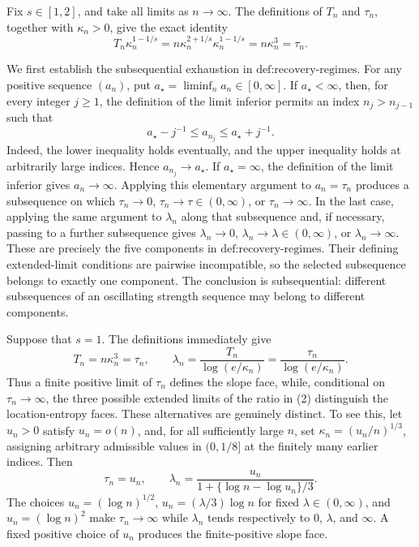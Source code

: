 Fix \(s\in[1,2]\), and take all limits as \(n\to\infty\).  The definitions of \(T_n\) and \(\tau_n\), together with \(\kappa_n>0\), give the exact identity
\[
 T_n\kappa_n^{1-1/s}
 =n\kappa_n^{2+1/s}\kappa_n^{1-1/s}
 =n\kappa_n^3
 =\tau_n.
 \tag{1}
\]

We first establish the subsequential exhaustion in \(\text{def:recovery-regimes}\).  For any positive sequence \((a_n)\), put \(a_\star=\liminf_n a_n\in[0,\infty]\).  If \(a_\star<\infty\), then, for every integer \(j\ge1\), the definition of the limit inferior permits an index \(n_j>n_{j-1}\) such that
\[
 a_\star-j^{-1}\le a_{n_j}\le a_\star+j^{-1}.
\]
Indeed, the lower inequality holds eventually, and the upper inequality holds at arbitrarily large indices.  Hence \(a_{n_j}\to a_\star\).  If \(a_\star=\infty\), the definition of the limit inferior gives \(a_n\to\infty\).  Applying this elementary argument to \(a_n=\tau_n\) produces a subsequence on which \(\tau_n\to0\), \(\tau_n\to\tau\in(0,\infty)\), or \(\tau_n\to\infty\).  In the last case, applying the same argument to \(\lambda_n\) along that subsequence and, if necessary, passing to a further subsequence gives \(\lambda_n\to0\), \(\lambda_n\to\lambda\in(0,\infty)\), or \(\lambda_n\to\infty\).  These are precisely the five components in \(\text{def:recovery-regimes}\).  Their defining extended-limit conditions are pairwise incompatible, so the selected subsequence belongs to exactly one component.  The conclusion is subsequential: different subsequences of an oscillating strength sequence may belong to different components.

Suppose that \(s=1\).  The definitions immediately give
\[
 T_n=n\kappa_n^3=\tau_n,
 \qquad
 \lambda_n=\frac{T_n}{\log(e/\kappa_n)}
 =\frac{\tau_n}{\log(e/\kappa_n)}.
 \tag{2}
\]
Thus a finite positive limit of \(\tau_n\) defines the slope face, while, conditional on \(\tau_n\to\infty\), the three possible extended limits of the ratio in (2) distinguish the location-entropy faces.  These alternatives are genuinely distinct.  To see this, let \(u_n>0\) satisfy \(u_n=o(n)\), and, for all sufficiently large \(n\), set \(\kappa_n=(u_n/n)^{1/3}\), assigning arbitrary admissible values in \((0,1/8]\) at the finitely many earlier indices.  Then
\[
 \tau_n=u_n,
 \qquad
 \lambda_n
 =\frac{u_n}{1+\{\log n-\log u_n\}/3}.
 \tag{3}
\]
The choices \(u_n=(\log n)^{1/2}\), \(u_n=(\lambda/3)\log n\) for fixed \(\lambda\in(0,\infty)\), and \(u_n=(\log n)^2\) make \(\tau_n\to\infty\) while \(\lambda_n\) tends respectively to \(0\), \(\lambda\), and \(\infty\).  A fixed positive choice of \(u_n\) produces the finite-positive slope face.


